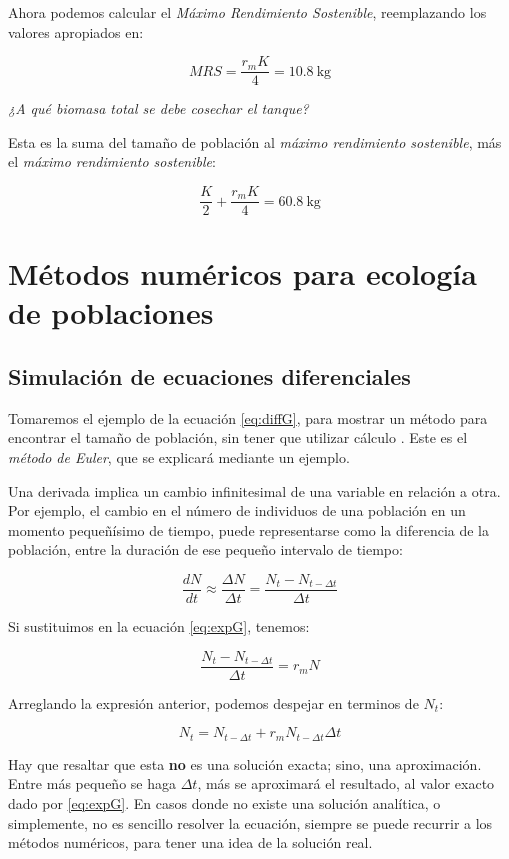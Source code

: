 \documentclass[12pt,letterpaper,]{book}
\begin{document}
Ahora podemos calcular el \emph{Máximo Rendimiento Sostenible},
reemplazando los valores apropiados en:

\[
MRS=\frac{r_m K}{4} = \SI{10.8}{\kilogram}
\]

\emph{¿A qué biomasa total se debe cosechar el tanque?}

Esta es la suma del tamaño de población al \emph{máximo rendimiento
sostenible}, más el \emph{máximo rendimiento sostenible}:

\[
\frac{K}{2} + \frac{r_m K}{4} = \SI{60.8}{\kilogram}
\]

\begingroup
\small
\printindex
\vfill
\endgroup

\appendix


\chapter{Métodos numéricos para ecología de
poblaciones}\label{metodos-numericos-para-ecologia-de-poblaciones}

\section{Simulación de ecuaciones
diferenciales}\label{simulacion-de-ecuaciones-diferenciales}

Tomaremos el ejemplo de la ecuación \eqref{eq:diffG}, para mostrar un
método para encontrar el tamaño de población, sin tener que utilizar
cálculo \citep{Barrantes2015}. Este es el \emph{método de Euler}, que se
explicará mediante un ejemplo.

Una derivada implica un cambio infinitesimal de una variable en relación
a otra. Por ejemplo, el cambio en el número de individuos de una
población en un momento pequeñísimo de tiempo, puede representarse como
la diferencia de la población, entre la duración de ese pequeño
intervalo de tiempo:

\[
\frac{dN}{dt} \approx \frac{\Delta N}{\Delta t} = \frac{N_t - N_{t-\Delta t}}{\Delta t}
\]

Si sustituimos en la ecuación \eqref{eq:expG}, tenemos:

\[
\frac{N_t - N_{t-\Delta t}}{\Delta t} = r_m N
\]

Arreglando la expresión anterior, podemos despejar en terminos de
\(N_t\):

\[
N_t= N_{t-\Delta t} + r_m N_{t-\Delta t} \Delta t
\]

Hay que resaltar que esta \textbf{no} es una solución exacta; sino, una
aproximación. Entre más pequeño se haga \(\Delta t\), más se aproximará
el resultado, al valor exacto dado por \eqref{eq:expG}. En casos donde no
existe una solución analítica, o simplemente, no es sencillo resolver la
ecuación, siempre se puede recurrir a los métodos numéricos, para tener
una idea de la solución real.
\end{document}
